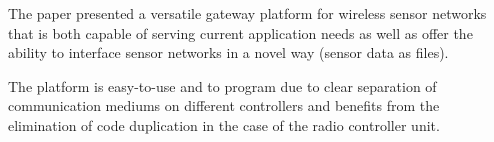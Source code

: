The paper presented a versatile gateway platform for wireless sensor networks
that is both capable of serving current application needs as well as offer the
ability to interface sensor networks in a novel way (sensor data as files). 

The platform is easy-to-use and to program due to clear separation of
communication mediums on different controllers and benefits from the
elimination of code duplication in the case of the radio controller unit.
